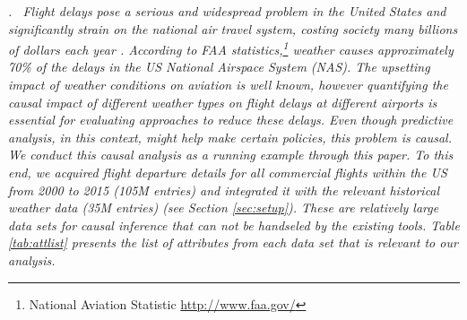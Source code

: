 \vspace{-.2cm}
\begin{example} \em \delay. \ \em   Flight delays pose a serious
and widespread problem in the United States and
 significantly strain on the national air travel system, costing society many billions of dollars each year \cite{ball2010total}.
 According to FAA statistics,\footnote{National Aviation Statistic \url{http://www.faa.gov/}}
   weather causes approximately 70\% of the delays in the US National Airspace System (NAS). The upsetting impact
   of weather conditions on aviation is well known, however quantifying
  the causal impact of different weather types on flight delays
at different airports is essential for evaluating
approaches to reduce these delays. Even though predictive analysis, in this context, might help make certain policies,
this problem is causal. We conduct this causal analysis as a running example through this paper. To this end,
we acquired flight departure details for all commercial flights within the US from 2000 to 2015
(105M entries) and integrated it with the relevant historical weather data (35M entries) (see Section \ref{sec:setup}).
These are relatively large data sets for causal inference that can not be handseled by the existing tools. Table \ref{tab:attlist} presents
the list of attributes from each data set that is relevant to our analysis.









\end{example}
